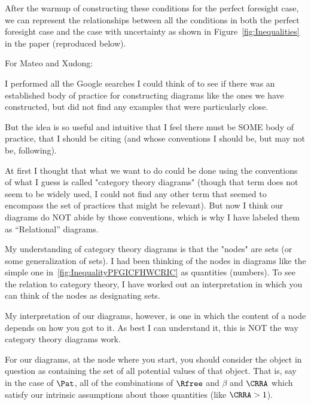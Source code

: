 \documentclass[\econtexRoot/BufferStockTheory]{subfiles}
\begin{document}
After the warmup of constructing these conditions for the perfect foresight case, we can represent the relationships between all the conditions in both the perfect foresight case and the case with uncertainty as shown in Figure~\ref{fig:Inequalities} in the paper (reproduced below).

\renewcommand{\figName}{Inequalities} %
\renewcommand{\figFile}{\figName} %
\hypertarget{\figFile}{}
\hypertarget{\figName}{}

\begin{Private}
  \pagebreak


  For Mateo and Xudong:
  
  I performed all the Google searches I could think of to see if there was an established body of practice for constructing diagrams like the ones we have constructed, but did not find any examples that were particularly close.  

  But the idea is so useful and intuitive that I feel there must be SOME body of practice, that I should be citing (and whose conventions I should be, but may not be, following).

  At first I thought that what we want to do could be done using the conventions of what I guess is called "category theory diagrams" (though that term does not seem to be widely used, I could not find any other term that seemed to encompass the set of practices that might be relevant). But now I think our diagrams do NOT abide by those conventions, which is why I have labeled them as ``Relational'' diagrams.

  My understanding of category theory diagrams is that the "nodes" are sets (or some generalization of sets). I had been thinking of the nodes in diagrams like the simple one in~\ref{fig:InequalityPFGICFHWCRIC} as quantities (numbers).  To see the relation to category theory, I have worked out an interpretation in which you can think of the nodes as designating sets.

  My interpretation of our diagrams, however, is one in which the content of a node depends on how you got to it. As best I can understand it, this is NOT the way category theory diagrams work.

  For our diagrams, at the node where you start, you should consider the object in question as containing the set of all potential values of that object. That is, say in the case of $\Pat$, all of the combinations of $\Rfree$ and $\beta$ and $\CRRA$ which satisfy our intrinsic assumptions about those quantities (like $\CRRA > 1$).


\end{Private}
\end{document}
